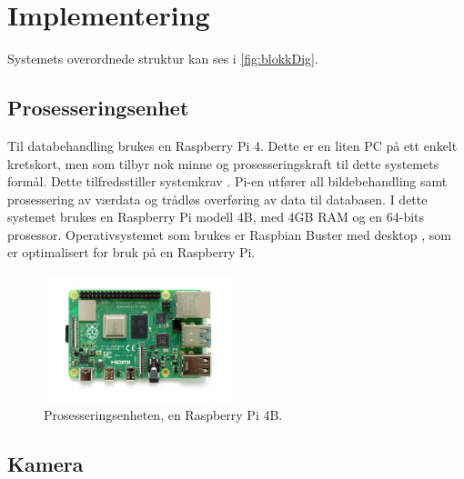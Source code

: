 \section{Implementering}
\label{sec:implementering}

Systemets overordnede struktur kan ses i \autoref{fig:blokkDig}.



\subsection{Prosesseringsenhet}\label{sec:impl:prosessor}

Til databehandling brukes en Raspberry Pi 4. 
Dette er en liten PC på ett enkelt kretskort, men som tilbyr nok minne og prosesseringskraft til dette systemets formål. 
Dette tilfredsstiller systemkrav . 
Pi-en utfører all bildebehandling samt prosessering av værdata og trådløs overføring av data til databasen. 
I dette systemet brukes en Raspberry Pi modell 4B, med 4GB RAM og en 64-bits prosessor\cite{raspberry}. 
Operativsystemet som brukes er Raspbian Buster med desktop \cite{raspbian}, som er optimalisert for bruk på en Raspberry Pi.

\begin{figure}[H]
    \centering
    \includegraphics[width=0.5\textwidth]{implementering/pi4.png}
    \caption{Prosesseringsenheten, en Raspberry Pi 4B.}
    \label{fig:pi}
\end{figure}


\subsection{Kamera}\label{sec:impl:kamera}

